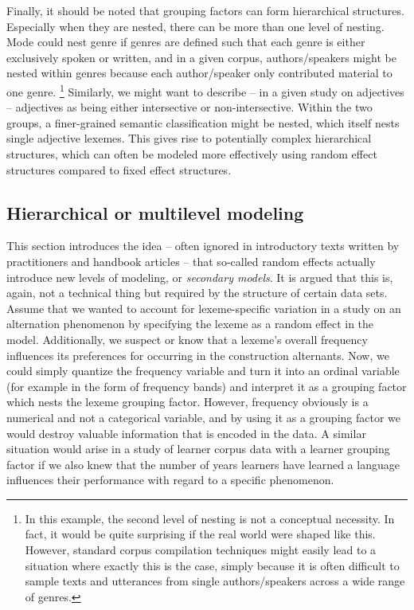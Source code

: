 \documentclass[a4paper,12pt]{article}
\begin{document}
Finally, it should be noted that grouping factors can form hierarchical structures.
Especially when they are nested, there can be more than one level of nesting.
Mode could nest genre if genres are defined such that each genre is either exclusively spoken or written, and in a given corpus, authors\slash speakers might be nested within genres because each author\slash speaker only contributed material to one genre.%
\footnote{In this example, the second level of nesting is not a conceptual necessity.
In fact, it would be quite surprising if the real world were shaped like this.
However, standard corpus compilation techniques might easily lead to a situation where exactly this is the case, simply because it is often difficult to sample texts and utterances from single authors\slash speakers across a wide range of genres.}
Similarly, we might want to describe -- in a given study on adjectives -- adjectives as being either intersective or non-intersective.
Within the two groups, a finer-grained semantic classification might be nested, which itself nests single adjective lexemes.
This gives rise to potentially complex hierarchical structures, which can often be modeled more effectively using random effect structures compared to fixed effect structures.

\subsection{Hierarchical or multilevel modeling}
\label{sec:hierarchicalormultilevelmodels}

This section introduces the idea -- often ignored in introductory texts written by practitioners and handbook articles -- that so-called random effects actually introduce new levels of modeling, or \textit{secondary models}.
It is argued that this is, again, not a technical thing but required by the structure of certain data sets.
Assume that we wanted to account for lexeme-specific variation in a study on an alternation phenomenon by specifying the lexeme as a random effect in the model.
Additionally, we suspect or know that a lexeme's overall frequency influences its preferences for occurring in the construction alternants.
Now, we could simply quantize the frequency variable and turn it into an ordinal variable (for example in the form of frequency bands) and interpret it as a grouping factor which nests the lexeme grouping factor.
However, frequency obviously is a numerical and not a categorical variable, and by using it as a grouping factor we would destroy valuable information that is encoded in the data.
A similar situation would arise in a study of learner corpus data with a learner grouping factor if we also knew that the number of years learners have learned a language influences their performance with regard to a specific phenomenon.
\end{document}
